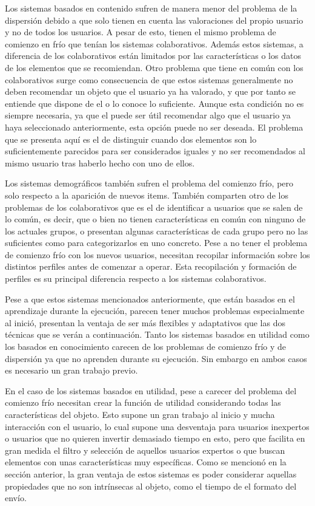 Los sistemas basados en contenido sufren de manera menor del problema de la dispersión debido a que solo tienen en cuenta las valoraciones del propio usuario y no de todos los usuarios. A pesar de esto, tienen el mismo problema de comienzo en frío que tenían los sistemas colaborativos. Además estos sistemas, a diferencia de los colaborativos están limitados por las características o los datos de los elementos que se recomiendan. Otro problema que tiene en común con los colaborativos surge como consecuencia de que estos sistemas generalmente no deben recomendar un objeto que el usuario ya ha valorado, y que por tanto se entiende que dispone de el o lo conoce lo suficiente. Aunque esta condición no es siempre necesaria, ya que el puede ser útil recomendar algo que el usuario ya haya seleccionado anteriormente, esta opción puede no ser deseada. El problema que se presenta aquí es el de distinguir cuando dos elementos son lo suficientemente parecidos para ser considerados iguales y no ser recomendados al mismo usuario tras haberlo hecho con uno de ellos.

Los sistemas demográficos también sufren el problema del comienzo frío, pero solo respecto a la aparición de nuevos items. También comparten otro de los problemas de los colaborativos que es el de identificar a usuarios que se salen de lo común, es decir, que o bien no tienen características en común con ninguno de los actuales grupos, o presentan algunas características de cada grupo pero no las suficientes como para categorizarlos en uno concreto. Pese a no tener el problema de comienzo frío con los nuevos usuarios, necesitan recopilar información sobre los distintos perfiles antes de comenzar a operar. Esta recopilación y formación de perfiles es su principal diferencia respecto a los sistemas colaborativos.

Pese a que estos sistemas mencionados anteriormente, que están basados en el aprendizaje durante la ejecución, parecen tener muchos problemas especialmente al inició, presentan la ventaja de ser más flexibles y adaptativos que las dos técnicas que se verán a continuación. Tanto los sistemas basados en utilidad como los basados en conocimiento carecen de los problemas de comienzo frío y de dispersión ya que no aprenden durante su ejecución. Sin embargo en ambos casos es necesario un gran trabajo previo.

En el caso de los sistemas basados en utilidad, pese a carecer del problema del comienzo frío necesitan crear la función de utilidad considerando todas las características del objeto. Esto supone un gran trabajo al inicio y mucha interacción con el usuario, lo cual supone una desventaja para usuarios inexpertos o usuarios que no quieren invertir demasiado tiempo en esto, pero que facilita en gran medida el filtro y selección de aquellos usuarios expertos o que buscan elementos con unas características muy específicas. Como se mencionó en la sección anterior, la gran ventaja de estos sistemas es poder considerar aquellas propiedades que no son intrínsecas al objeto, como el tiempo de el formato del envío. 

